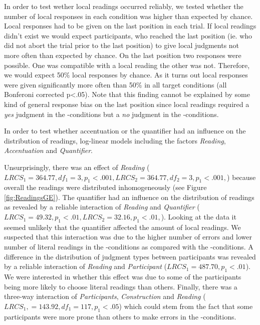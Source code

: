 \documentclass[fleqn,reqno,10pt,draft]{article}
\newcommand{\as}{\acro{as}}
\renewcommand{\es}{\acro{es}}
\begin{document}
In order to test wether local readings occurred reliably, we tested whether the
number of local responses in each condition was higher than expected
by chance. Local responses had to be given on the last position in
each trial. If local readings didn't exist we would expect
participants, who reached the last position (ie. who did not abort the
trial prior to the last position) to give local judgments not more
often than expected by chance. On the last position two responses were
possible. One was compatible with a local reading the other was
not. Therefore, we would expect 50\% local responses by chance. As it
turns out local responses were given significantly more often than
50\% in all target conditions (all Bonferoni corrected p<.05). Note
that this finding cannot be explained by some kind of general response
bias on the last position since local readings required a \emph{yes} judgment
in the \es-conditions but a \emph{no} judgment in the \as-conditions.


In order to test whether accentuation or the quantifier had an
influence on the distribution of readings, log-linear models 
including the factors {\it Reading}, {\it Accentuation} and 
{\it Quantifier}. 

Unsurprisingly, there was an effect of \emph{Reading} ($LRCS_1=364.77,
df_1 = 3, p_1<.001, LRCS_2=364.77, df_2 = 3, p_1<.001,$) because
overall the readings were distributed inhomogeneously (see Figure
\ref{fig:ReadingsGE}). The quantifier had an influence on the
distribution of readings as revealed by a reliable interaction of {\it
  Reading} and {\it Quantifier} ($LRCS_1=49.32, p_1<.01,LRCS_2=32.16,
p_1<.01,$). Looking at the data it seemed unlikely that the quantifier
affected the amount of local readings. We suspected that this
interaction was due to the higher number of errors and lower number of
literal readings in the \es-conditions as compared with the
\as-conditions. A difference in the distribution of judgment types
between participants was revealed by a reliable interaction of {\it
  Reading} and {\it Participant} ($LRCS_1=487.70, p_1<.01$). We were
interested in whether this effect was due to some of the participants
being more likely to choose literal readings than others. Finally,
there was a three-way interaction of {\it Participants}, {\it
  Construction} and {\it Reading} ($LRCS_1, = 143.92, df_1 = 117,
p_1<.05$) which could stem from the fact that some participants were
more prone than others to make errors in the \es-conditions.
\end{document}
